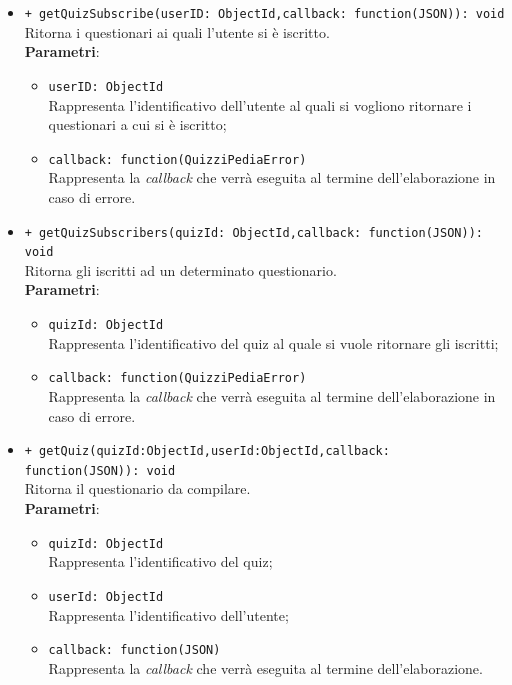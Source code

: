 \begin{itemize}
\begin{itemize}
			\item \texttt{+ getQuizSubscribe(userID: ObjectId,callback: function(JSON)): void}\\
				Ritorna i questionari ai quali l'utente si è iscritto.\\
				\textbf{Parametri}:
				\begin{itemize}
					\item \texttt{userID: ObjectId}\\
					Rappresenta l'identificativo dell'utente al quali si vogliono ritornare i questionari a cui si è iscritto;
					\item \texttt{callback: function(QuizziPediaError)}\\
					Rappresenta la \textit{callback} che verrà eseguita al termine dell'elaborazione in caso di errore.
				\end{itemize}
				
			\item \texttt{+ getQuizSubscribers(quizId: ObjectId,callback: function(JSON)): void}\\
			Ritorna gli iscritti ad un determinato questionario.\\
			\textbf{Parametri}:
			\begin{itemize}
				\item \texttt{quizId: ObjectId}\\
				Rappresenta l'identificativo del quiz al quale si vuole ritornare gli iscritti;
				\item \texttt{callback: function(QuizziPediaError)}\\
				Rappresenta la \textit{callback} che verrà eseguita al termine dell'elaborazione in caso di errore.
			\end{itemize}
				
			
			\item \texttt{+ getQuiz(quizId:ObjectId,userId:ObjectId,callback: function(JSON)): void}\\
			Ritorna il questionario da compilare.\\
			\textbf{Parametri}:
			\begin{itemize}
				\item \texttt{quizId: ObjectId}\\
				Rappresenta l'identificativo del quiz;
				\item \texttt{userId: ObjectId}\\
				Rappresenta l'identificativo dell'utente;
				\item \texttt{callback: function(JSON)}\\
				Rappresenta la \textit{callback} che verrà eseguita al termine dell'elaborazione.
			\end{itemize}
		\end{itemize}
\end{itemize}